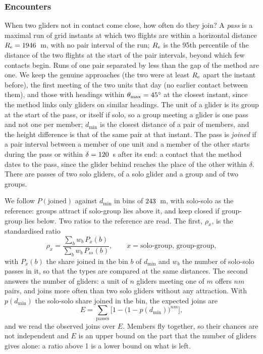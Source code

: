 \subsubsection{Encounters}\label{sec:encounters}

When two gliders not in contact come close, how often do they join? A \emph{pass} is a maximal run
of grid instants at which two flights are within a horizontal distance $R_{\rm e}=1946$~m, with no
pair interval of the run; $R_{\rm e}$ is the 95th percentile of the distance of the two flights at
the start of the pair intervals, beyond which few contacts begin. Runs of one pair separated by
less than the gap of the method are one. We keep the genuine approaches (the two were at least
$R_{\rm e}$ apart the instant before), the first meeting of the two units that day (no earlier contact between them),
and those with headings within $\theta_{\max}=45^\circ$ at the closest instant, since the
method links only gliders on similar headings. The unit of a glider is its group at the start of the
pass, or itself if solo, so a group meeting a glider is one pass and not one per member; $d_{\min}$
is the closest distance of a pair of members, and the height difference is that of the same pair
at that instant. The pass is \emph{joined} if a pair interval between a
member of one unit and a member of the other starts during the pass or within $\delta=120$~s
after its end: a contact that the method dates to the pass, since the glider behind reaches the
place of the other within $\delta$. There are \StEnPassesSoloSolo{}
passes of two solo gliders, \StEnPassesSoloGroup{} of a solo glider and a group and
\StEnPassesGroupGroup{} of two groups.

We follow $P(\text{joined})$ against $d_{\min}$ in \StEnBins{} bins of $243$~m, with solo-solo as the
reference: groups attract if solo-group lies above it, and keep closed if group-group lies below.
Two ratios to the reference are read. The first, $\rho_x$, is the standardised ratio
\begin{equation}\label{eq:standard}
\rho_x=\frac{\sum_b w_b\,P_x(b)}{\sum_b w_b\,P_{ss}(b)},\qquad x=\text{solo-group, group-group},
\end{equation}
with $P_x(b)$ the share joined in the bin $b$ of $d_{\min}$ and $w_b$ the number of solo-solo
passes in it, so that the types are compared at the same distances. The second answers the number
of gliders: a unit of $n$ gliders meeting one of $m$ offers $nm$ pairs, and joins more often than two
solo gliders without any attraction. With $p(d_{\min})$ the solo-solo share joined in the bin, the
expected joins are
\begin{equation}\label{eq:chances}
E=\sum_{\text{passes}}\Big[1-\big(1-p(d_{\min})\big)^{nm}\Big],
\end{equation}
and we read the observed joins over $E$. Members fly together, so their chances are not
independent and $E$ is an upper bound on the part that the number of gliders gives alone: a ratio
above 1 is a lower bound on what is left.

